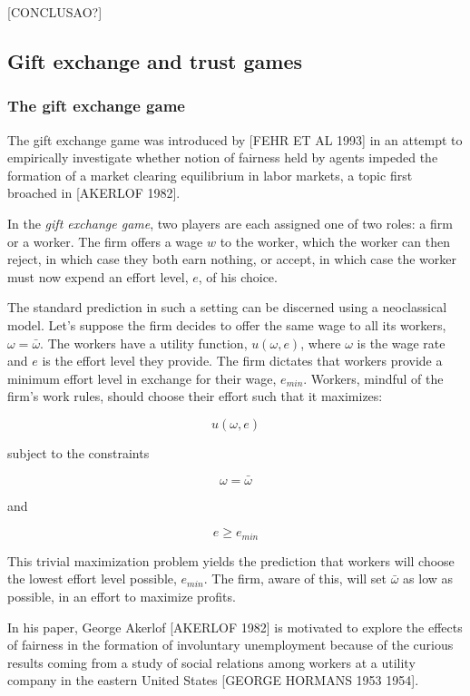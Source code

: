 \message{ !name(tese.tex)}\documentclass{article}
\begin{document}
[CONCLUSAO?]

\subsection{Gift exchange and trust games}
\subsubsection{The gift exchange game}

The gift exchange game was introduced by [FEHR ET AL 1993] in an attempt to empirically investigate whether notion of fairness held by agents impeded the formation of a market clearing equilibrium in labor markets, a topic first broached in [AKERLOF 1982]. 

In the \textit{gift exchange game}, two players are each assigned one of two roles: a firm or a worker. The firm offers a wage $w$ to the worker, which the worker can then reject, in which case they both earn nothing, or accept, in which case the worker must now expend an effort level, $e$, of his choice. 

The standard prediction in such a setting can be discerned using a neoclassical model. Let's suppose the firm decides to offer the same wage to all its workers, $\omega = \bar{\omega}$. The workers have a utility function, $u(\omega,e)$, where $\omega$ is the wage rate and $e$ is the effort level they provide. The firm dictates that workers provide a minimum effort level in exchange for their wage, $e_{min}$. Workers, mindful of the firm's work rules, should choose their effort such that it maximizes:

\begin{equation}
u(\omega,e)
\end{equation}

subject to the constraints

\begin{equation}
\omega = \bar{\omega}
\end{equation}

and


\begin{equation}
e \geq e_{min}
\end{equation}


This trivial maximization problem yields the prediction that workers will choose the lowest effort level possible, $e_{min}$. The firm, aware of this, will set $\bar{\omega}$ as low as possible, in an effort to maximize profits. 

In his paper, George Akerlof [AKERLOF 1982] is motivated to explore the effects of fairness in the formation of involuntary unemployment because of the curious results coming from a study of social relations among workers at a utility company in the eastern United States [GEORGE HORMANS 1953 1954]. 
\end{document}
